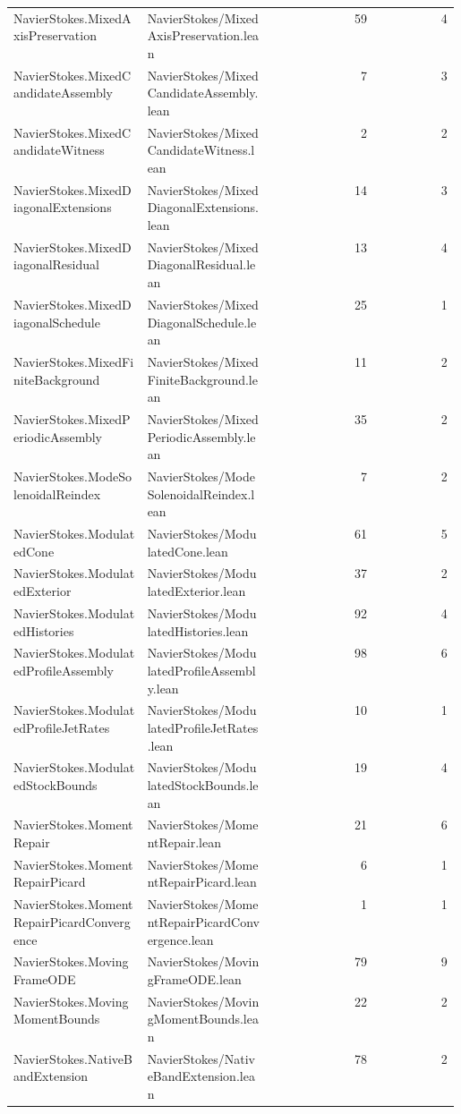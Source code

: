 \begin{longtable}{p{0.30\linewidth}p{0.28\linewidth}rr}
NavierStokes.MixedAxisPreservation & NavierStokes/MixedAxisPreservation.lean & 59 & 4\\
NavierStokes.MixedCandidateAssembly & NavierStokes/MixedCandidateAssembly.lean & 7 & 3\\
NavierStokes.MixedCandidateWitness & NavierStokes/MixedCandidateWitness.lean & 2 & 2\\
NavierStokes.MixedDiagonalExtensions & NavierStokes/MixedDiagonalExtensions.lean & 14 & 3\\
NavierStokes.MixedDiagonalResidual & NavierStokes/MixedDiagonalResidual.lean & 13 & 4\\
NavierStokes.MixedDiagonalSchedule & NavierStokes/MixedDiagonalSchedule.lean & 25 & 1\\
NavierStokes.MixedFiniteBackground & NavierStokes/MixedFiniteBackground.lean & 11 & 2\\
NavierStokes.MixedPeriodicAssembly & NavierStokes/MixedPeriodicAssembly.lean & 35 & 2\\
NavierStokes.ModeSolenoidalReindex & NavierStokes/ModeSolenoidalReindex.lean & 7 & 2\\
NavierStokes.ModulatedCone & NavierStokes/ModulatedCone.lean & 61 & 5\\
NavierStokes.ModulatedExterior & NavierStokes/ModulatedExterior.lean & 37 & 2\\
NavierStokes.ModulatedHistories & NavierStokes/ModulatedHistories.lean & 92 & 4\\
NavierStokes.ModulatedProfileAssembly & NavierStokes/ModulatedProfileAssembly.lean & 98 & 6\\
NavierStokes.ModulatedProfileJetRates & NavierStokes/ModulatedProfileJetRates.lean & 10 & 1\\
NavierStokes.ModulatedStockBounds & NavierStokes/ModulatedStockBounds.lean & 19 & 4\\
NavierStokes.MomentRepair & NavierStokes/MomentRepair.lean & 21 & 6\\
NavierStokes.MomentRepairPicard & NavierStokes/MomentRepairPicard.lean & 6 & 1\\
NavierStokes.MomentRepairPicardConvergence & NavierStokes/MomentRepairPicardConvergence.lean & 1 & 1\\
NavierStokes.MovingFrameODE & NavierStokes/MovingFrameODE.lean & 79 & 9\\
NavierStokes.MovingMomentBounds & NavierStokes/MovingMomentBounds.lean & 22 & 2\\
NavierStokes.NativeBandExtension & NavierStokes/NativeBandExtension.lean & 78 & 2\\

\end{longtable}
